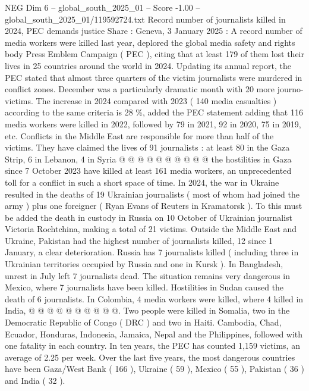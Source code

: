\begin{textsample}{NEG Dim 6 – global\_south\_2025\_01 – Score -1.00 – global\_south\_2025\_01/119592724.txt}  \label{ex:f6_neg_006}
Record number of journalists killed in 2024, PEC demands justice Share : Geneva, 3 January 2025 : A record number of media workers were killed last year, deplored the global media safety and rights body Press Emblem Campaign ( PEC ), citing that at least 179 of them lost their lives in 25 countries around the world in 2024.
Updating its annual report, the PEC stated that almost three quarters of the victim journalists were murdered in conflict zones.
December was a particularly dramatic month with 20 more journo-victims.
The increase in 2024 compared with 2023 ( 140 media casualties ) according to the same criteria is 28 \%, added the PEC statement adding that 116 media workers were killed in 2022, followed by 79 in 2021, 92 in 2020, 75 in 2019, etc.
Conflicts in the Middle East are responsible for more than half of the victims.
They have claimed the lives of 91 journalists : at least 80 in the Gaza Strip, 6 in Lebanon, 4 in Syria @ @ @ @ @ @ @ @ @ @ the hostilities in Gaza since 7 October 2023 have killed at least 161 media workers, an unprecedented toll for a conflict in such a short space of time.
In 2024, the war in Ukraine resulted in the deaths of 19 Ukrainian journalists ( most of whom had joined the army ) plus one foreigner ( Ryan Evans of Reuters in Kramatorsk ).
To this must be added the death in custody in Russia on 10 October of Ukrainian journalist Victoria Rochtchina, making a total of 21 victims.
Outside the Middle East and Ukraine, Pakistan had the highest number of journalists killed, 12 since 1 January, a clear deterioration.
Russia has 7 journalists killed ( including three in Ukrainian territories occupied by Russia and one in Kursk ).
In Bangladesh, unrest in July left 7 journalists dead.
The situation remains very dangerous in Mexico, where 7 journalists have been killed.
Hostilities in Sudan caused the death of 6 journalists.
In Colombia, 4 media workers were killed, where 4 killed in India, @ @ @ @ @ @ @ @ @ @.
Two people were killed in Somalia, two in the Democratic Republic of Congo ( DRC ) and two in Haiti.
Cambodia, Chad, Ecuador, Honduras, Indonesia, Jamaica, Nepal and the Philippines, followed with one fatality in each country.
In ten years, the PEC has counted 1,159 victims, an average of 2.25 per week.
Over the last five years, the most dangerous countries have been Gaza/West Bank ( 166 ), Ukraine ( 59 ), Mexico ( 55 ), Pakistan ( 36 ) and India ( 32 ).

\end{textsample}

